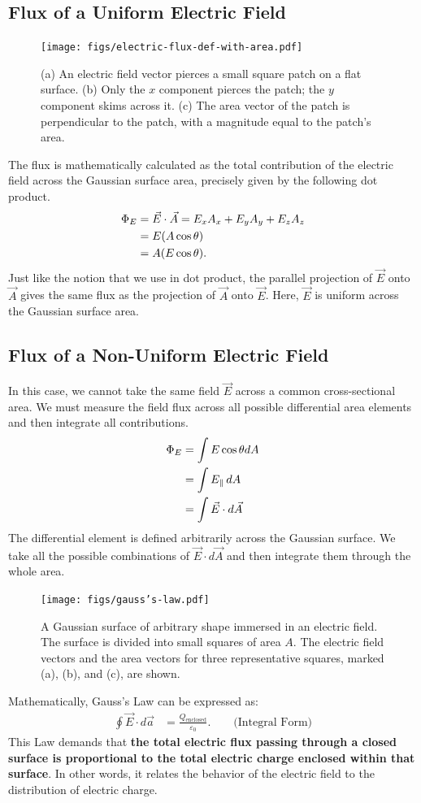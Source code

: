 \documentclass[12pt,b4paper]{article}
\begin{document}
\subsection{Flux of a Uniform Electric Field}
\begin{figure}[H]
    \centering
    \texttt{[image: figs/electric-flux-def-with-area.pdf]}
    \caption{(a) An electric field vector pierces a small square patch on a flat surface. (b) Only the $x$ component pierces the patch; the $y$ component skims across it. (c) The area vector of the patch is perpendicular to the patch, with a magnitude equal to the patch’s area.}
    \label{fig:electric-flux-area}
\end{figure}
The flux is mathematically calculated as the total contribution of the electric field across the Gaussian surface area, precisely given by the following dot product.
\begin{align}
    \Phi_E&=\vec{E}\cdot\Vec{A}=E_xA_x+E_yA_y+E_zA_z\\
    &=E(A\cos\theta)\notag\\
    &=A(E\cos\theta)\notag.
\end{align}
Just like the notion that we use in dot product, the parallel projection of $\vec{E}$ onto $\vec{A}$ gives the same flux as the projection of $\vec{A}$ onto $\vec{E}$. Here, $\vec{E}$ is uniform across the Gaussian surface area.
\subsection{Flux of a Non-Uniform Electric Field}
In this case, we cannot take the same field $\vec{E}$ across a common cross-sectional area. We must measure the field flux across all possible differential area elements and then integrate all contributions.
\begin{align}
    \Phi_E&=\int E\cos\theta dA\\
    &=\int E_\parallel\, dA\notag\\
    &=\int\vec{E}\cdot d\vec{A}
\end{align}
The differential element is defined arbitrarily across the Gaussian surface. We take all the possible combinations of $\vec{E}\cdot d\vec{A}$ and then integrate them through the whole area.
\begin{figure}[H]
    \centering
    \texttt{[image: figs/gauss's-law.pdf]}
    \caption{A Gaussian surface of arbitrary shape immersed in an electric field. The surface is divided into small squares of area $A$. The electric field vectors and the area vectors for three representative squares, marked (a), (b), and (c), are shown.}
    \label{fig:gauss-law}
\end{figure}
Mathematically, Gauss's Law can be expressed as:
\begin{align}
    \oint \Vec{E}\cdot d\Vec{a} &= \frac{Q_\text{enclosed}}{\varepsilon_0}.\qquad\text{(Integral Form)}\label{gauss-integral}
\end{align}
This Law demands that \textbf{the total electric flux passing through a closed surface is proportional to the total electric charge enclosed within that surface}. In other words, it relates the behavior of the electric field to the distribution of electric charge.
\end{document}
